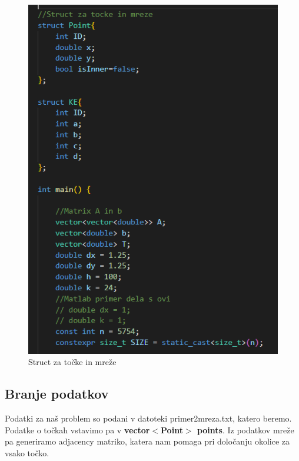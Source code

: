 \documentclass[12pt]{article}
\begin{document}
    \begin{figure}[ht]
        \centering
        \includegraphics[width=0.5\linewidth]{declare.png}
        \renewcommand*\figurename{Slika}
        \caption{Struct za točke in mreže}
        \label{Slika:1}
    \end{figure}

\FloatBarrier
\subsection{Branje podatkov}
    Podatki za naš problem so podani v datoteki primer2mreza.txt, katero beremo. Podatke o točkah vstavimo pa v \textbf{vector$<$Point$>$ points}. Iz podatkov mreže pa generiramo adjacency matriko, katera nam pomaga pri določanju okolice za vsako točko.
\end{document}
